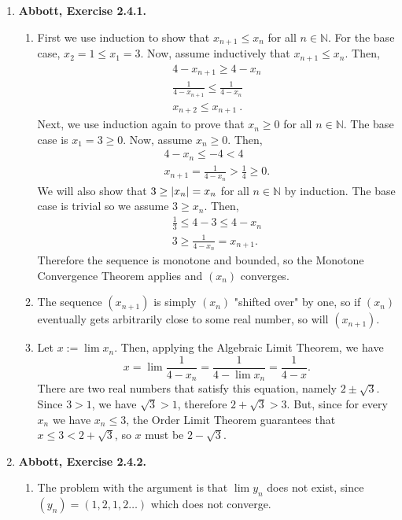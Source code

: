 \documentclass{article}
\DeclarePairedDelimiter\abs{\lvert}{\rvert}
\newcommand{\N}{\mathbb{N}}
\newcommand{\exc}[2][Abbott]{\item \textbf{#1, Exercise #2.}}
\begin{document}
\begin{enumerate}
    \exc{2.4.1}
    \begin{enumerate}
    	\item First we use induction to show that $x_{n+1} \leq x_n$ for all $n \in \N$. For the base case, $x_2 = 1 \leq x_1 = 3$. Now, assume inductively that $x_{n+1} \leq x_n$. Then, \begin{gather*}
    	      4-x_{n+1} \geq 4-x_n \\ 
    	      \frac{1}{4-x_{n+1}} \leq \frac{1}{4-x_n} \\ 
    	      x_{n+2} \leq x_{n+1} ~ .
    	\end{gather*}
    	Next, we use induction again to prove that $x_n \geq 0$ for all $n \in \N$. The base case is $x_1 = 3 \geq 0$. Now, assume $x_n \geq 0$. Then, \begin{gather*}
    	4-x_n \leq - 4 < 4 \\ 
    	x_{n+1} = \frac{1}{4-x_n} > \frac{1}{4} \geq 0.
    	\end{gather*} We will also show that $3 \geq \abs{x_n} = x_n$ for all $n \in \N$ by induction. The base case is trivial so we assume $3 \geq x_n$. Then, \begin{gather*}
    	\frac{1}{3} \leq 4-3 \leq 4-x_n \\
    	3 \geq \frac{1}{4-x_n} = x_{n+1}.
    	\end{gather*} Therefore the sequence is monotone and bounded, so the Monotone Convergence Theorem applies and $(x_n)$ converges.
    		    	
    	\item The sequence $(x_{n+1})$ is simply $(x_n)$ "shifted over" by one, so if $(x_n)$ eventually gets arbitrarily close to some real number, so will $(x_{n+1})$.
    	
    	\item Let $x := \lim x_n$. Then, applying the Algebraic Limit Theorem, we have \begin{equation*}
    	    x = \lim \frac{1}{4-x_n} = \frac{1}{4-\lim x_n} = \frac{1}{4-x}.
    	\end{equation*} There are two real numbers that satisfy this equation, namely $2 \pm \sqrt{3}$. Since $3 > 1$, we have $\sqrt{3} > 1$, therefore $2 + \sqrt{3} > 3$. But, since for every $x_n$ we have $x_n \leq 3$, the Order Limit Theorem guarantees that $x \leq 3 < 2 + \sqrt{3}$, so $x$ must be $2 - \sqrt{3}$. 
    \end{enumerate} 
    
    \exc{2.4.2} 
    \begin{enumerate}
        \item  The problem with the argument is that $\lim y_n$ does not exist, since $(y_n) = (1,2,1,2 \dots)$ which does not converge.
        

\end{enumerate}
\end{enumerate}
\end{document}
